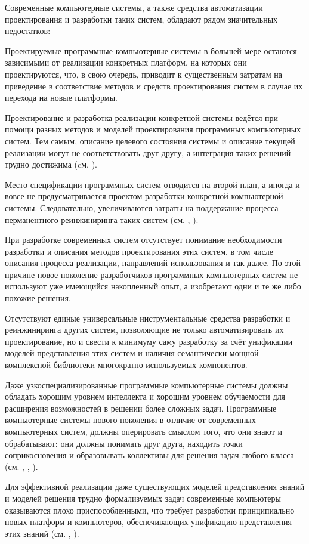 Современные компьютерные системы, а также средства автоматизации проектирования и разработки таких систем, обладают рядом значительных недостатков:

\begin{textitemize}
   \item Проектируемые программные компьютерные системы в большей мере остаются зависимыми от реализации конкретных платформ, на которых они проектируются, что, в свою очередь, приводит к существенным затратам на приведение в соответствие методов и средств проектирования систем в случае их перехода на новые платформы.
   \item Проектирование и разработка реализации конкретной системы ведётся при помощи разных методов и моделей проектирования программных компьютерных систем. Тем самым, описание целевого состояния системы и описание текущей реализации могут не соответствовать друг другу, а интеграция таких решений трудно достижима (cм. ).
   \item Место спецификации программных систем отводится на второй план, а иногда и вовсе не предусматривается проектом разработки конкретной компьютерной системы. Следовательно, увеличиваются затраты на поддержание процесса перманентного реинжиниринга таких систем (см. , ).
   \item При разработке современных систем отсутствует понимание необходимости разработки и описания методов проектирования этих систем, в том числе описания процесса реализации, направлений использования и так далее. По этой причине новое поколение разработчиков программных компьютерных систем не используют уже имеющийся накопленный опыт, а изобретают одни и те же либо похожие решения.
   \item Отсутствуют единые универсальные инструментальные средства разработки и реинжиниринга других систем, позволяющие не только автоматизировать их проектирование, но и свести к минимуму саму разработку за счёт унификации моделей представления этих систем и наличия семантически мощной комплексной библиотеки многократно используемых компонентов.
   \item Даже узкоспециализированные программные компьютерные системы должны обладать хорошим уровнем интеллекта и хорошим уровнем обучаемости для расширения возможностей в решении более сложных задач. Программные компьютерные системы нового поколения в отличие от современных компьютерных систем, должны оперировать смыслом того, что они знают и обрабатывают: они должны понимать друг друга, находить точки соприкосновения и образовывать коллективы для решения задач любого класса (см. , , ).
   \item Для эффективной реализации даже существующих моделей представления знаний и моделей решения трудно формализуемых задач современные компьютеры оказываются плохо приспособленными, что требует разработки принципиально новых платформ и компьютеров, обеспечивающих унификацию представления этих знаний (см. , ).
\end{textitemize}

